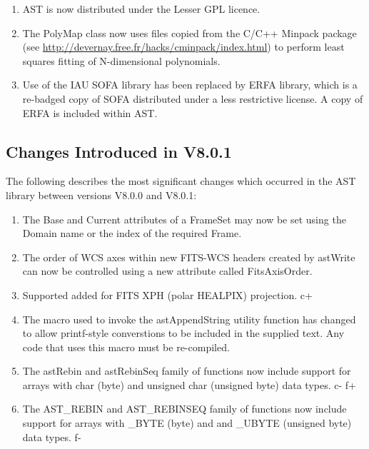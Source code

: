 \documentclass[twoside,11pt]{starlink}
\begin{document}
\begin{enumerate}

\item AST is now distributed under the Lesser GPL licence.

\item The PolyMap class now uses files copied from the C/C++ Minpack
package (see \url{http://devernay.free.fr/hacks/cminpack/index.html}) to perform
least squares fitting of N-dimensional polynomials.

\item Use of the IAU SOFA library has been replaced by ERFA library, which is
a re-badged copy of SOFA distributed under a less restrictive license. A
copy of ERFA is included within AST.

\end{enumerate}

\subsection{Changes Introduced in V8.0.1}

The following describes the most significant changes which
occurred in the AST library between versions V8.0.0 and V8.0.1:

\begin{enumerate}

\item The Base and Current attributes of a FrameSet may now be set using the
  Domain name or the index of the required Frame.
\item The order of WCS axes within new FITS-WCS headers created by astWrite
  can now be controlled using a new attribute called FitsAxisOrder.
\item Supported added for FITS XPH (polar HEALPIX) projection.
c+
\item The macro used to invoke the astAppendString utility function has
  changed to allow printf-style converstions to be included in the
  supplied text. Any code that uses this macro must be re-compiled.
\item The astRebin and astRebinSeq family of functions now include support
  for arrays with char (byte) and unsigned char (unsigned byte) data types.
c-
f+
\item The AST\_REBIN and AST\_REBINSEQ family of functions now include support
  for arrays with \_BYTE (byte) and and \_UBYTE (unsigned byte) data types.
f-

\end{enumerate}
\end{document}

